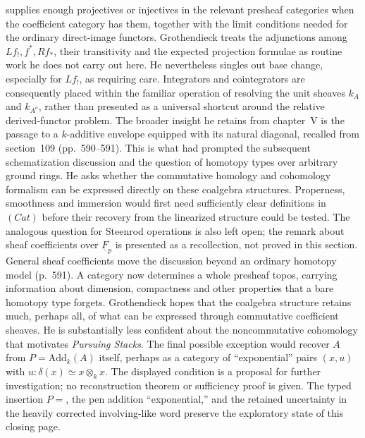 \documentclass[10pt,oneside]{book}
\begin{document}
supplies enough projectives or injectives in the relevant presheaf categories when the coefficient category has them, together with the limit conditions needed for the ordinary direct-image functors. Grothendieck treats the adjunctions among $Lf_!,f^*,Rf_*$, their transitivity and the expected projection formulae as routine work he does not carry out here. He nevertheless singles out base change, especially for $Lf_!$, as requiring care. Integrators and cointegrators are consequently placed within the familiar operation of resolving the unit sheaves $k_A$ and $k_{A^o}$, rather than presented as a universal shortcut around the relative derived-functor problem. The broader insight he retains from chapter~V is the passage to a $k$-additive envelope equipped with its natural diagonal, recalled from section~109 (pp.~590--591). This is what had prompted the subsequent schematization discussion and the question of homotopy types over arbitrary ground rings. He asks whether the commutative homology and cohomology formalism can be expressed directly on these coalgebra structures. Properness, smoothness and immersion would first need sufficiently clear definitions in $(Cat)$ before their recovery from the linearized structure could be tested. The analogous question for Steenrod operations is also left open; the remark about sheaf coefficients over $\underline F_p$ is presented as a recollection, not proved in this section. General sheaf coefficients move the discussion beyond an ordinary homotopy model (p.~591). A category now determines a whole presheaf topos, carrying information about dimension, compactness and other properties that a bare homotopy type forgets. Grothendieck hopes that the coalgebra structure retains much, perhaps all, of what can be expressed through commutative coefficient sheaves. He is substantially less confident about the noncommutative cohomology that motivates \emph{Pursuing Stacks}. The final possible exception would recover $A$ from $P=\mathrm{Add}_k(A)$ itself, perhaps as a category of ``exponential'' pairs $(x,u)$ with $u:\delta(x)\simeq x\otimes_kx$. The displayed condition is a proposal for further investigation; no reconstruction theorem or sufficiency proof is given. The typed insertion $P=$, the pen addition ``exponential,'' and the retained uncertainty in the heavily corrected involving-like word preserve the exploratory state of this closing page.
\end{document}
